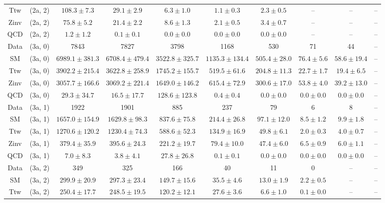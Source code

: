 \begin{table}[h!]
{\begin{tabular}{cccccccccc}
	Ttw & (2a, 2) & $108.3\pm 7.3$ & $29.1\pm 2.9$ & $6.3\pm 1.0$ & $1.1\pm 0.3$ & $2.3\pm 0.5$ & -- & -- & -- \\[0.5ex] 
	Zinv & (2a, 2) & $75.8\pm 5.2$ & $21.4\pm 2.2$ & $8.6\pm 1.3$ & $2.1\pm 0.5$ & $3.4\pm 0.7$ & -- & -- & -- \\[0.5ex] 
	QCD & (2a, 2) & $1.2\pm 1.2$ & $0.1\pm 0.1$ & $0.0\pm 0.0$ & $0.0\pm 0.0$ & $0.0\pm 0.0$ & -- & -- & -- \\[0.5ex] 
	Data & (3a, 0) & 7843 & 7827 & 3798 & 1168 & 530 & 71 & 44 & -- \\[0.5ex] 
	SM & (3a, 0) & $6989.1\pm 381.3$ & $6708.4\pm 479.4$ & $3522.8\pm 325.7$ & $1135.3\pm 134.4$ & $505.4\pm 28.0$ & $76.4\pm 5.6$ & $58.6\pm 19.4$ & -- \\[0.5ex] 
	Ttw & (3a, 0) & $3902.2\pm 215.4$ & $3622.8\pm 258.9$ & $1745.2\pm 155.7$ & $519.5\pm 61.6$ & $204.8\pm 11.3$ & $22.7\pm 1.7$ & $19.4\pm 6.5$ & -- \\[0.5ex] 
	Zinv & (3a, 0) & $3057.7\pm 166.6$ & $3069.2\pm 221.4$ & $1649.0\pm 146.2$ & $615.4\pm 72.9$ & $300.6\pm 17.0$ & $53.8\pm 4.0$ & $39.2\pm 13.0$ & -- \\[0.5ex] 
	QCD & (3a, 0) & $29.3\pm 34.7$ & $16.5\pm 17.7$ & $128.6\pm 123.8$ & $0.4\pm 0.4$ & $0.0\pm 0.0$ & $0.0\pm 0.0$ & $0.0\pm 0.0$ & -- \\[0.5ex] 
	Data & (3a, 1) & 1922 & 1901 & 885 & 237 & 79 & 6 & 8 & -- \\[0.5ex] 
	SM & (3a, 1) & $1657.0\pm 154.9$ & $1629.8\pm 98.3$ & $837.6\pm 75.8$ & $214.4\pm 26.8$ & $97.1\pm 12.0$ & $8.5\pm 1.2$ & $9.9\pm 1.8$ & -- \\[0.5ex] 
	Ttw & (3a, 1) & $1270.6\pm 120.2$ & $1230.4\pm 74.3$ & $588.6\pm 52.3$ & $134.9\pm 16.9$ & $49.8\pm 6.1$ & $2.0\pm 0.3$ & $4.0\pm 0.7$ & -- \\[0.5ex] 
	Zinv & (3a, 1) & $379.4\pm 35.9$ & $395.6\pm 24.3$ & $221.2\pm 19.7$ & $79.4\pm 10.0$ & $47.4\pm 6.0$ & $6.5\pm 0.9$ & $6.0\pm 1.1$ & -- \\[0.5ex] 
	QCD & (3a, 1) & $7.0\pm 8.3$ & $3.8\pm 4.1$ & $27.8\pm 26.8$ & $0.1\pm 0.1$ & $0.0\pm 0.0$ & $0.0\pm 0.0$ & $0.0\pm 0.0$ & -- \\[0.5ex] 
	Data & (3a, 2) & 349 & 325 & 166 & 40 & 11 & 0 & -- & -- \\[0.5ex] 
	SM & (3a, 2) & $299.9\pm 20.9$ & $297.3\pm 23.4$ & $149.7\pm 15.6$ & $35.5\pm 4.6$ & $13.0\pm 1.9$ & $2.2\pm 0.5$ & -- & -- \\[0.5ex] 
	Ttw & (3a, 2) & $250.4\pm 17.7$ & $248.5\pm 19.5$ & $120.2\pm 12.1$ & $27.6\pm 3.6$ & $6.6\pm 1.0$ & $0.1\pm 0.0$ & -- & -- \\[0.5ex] 

\end{tabular}}
\end{table}
